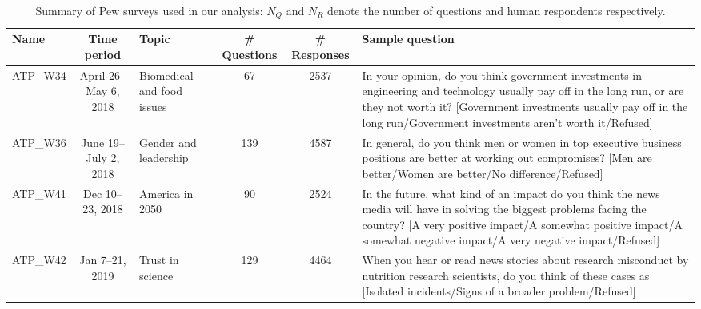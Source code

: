 \begin{table}[t]
    \ContinuedFloat
    \caption{Summary of Pew surveys used in our analysis: $N_Q$ and $N_R$ denote the number of questions and human respondents respectively.}
    \vskip 0.15in
    \renewcommand{\arraystretch}{1.25}
    \begin{center}
    \begin{small}
    
        \begin{tabular}{lcp{1.25cm}ccp{5cm}}
            \toprule
                Name &      Time period &                Topic &  \# Questions &  \# Responses &                                                                                                                                                                                                                                                                          Sample question \\
            \midrule
            ATP\_W34  & April 26–May 6, 2018 &   Biomedical and food issues &           67 &         2537 &                                    In your opinion, do you think government investments in engineering and technology usually pay off in the long run, or are they not worth it? [Government investments usually pay off in the long run/Government investments aren't worth it/Refused] \\
            ATP\_W36  & June 19–July 2, 2018 &      Gender and leadership &          139 &         4587 &                                                                                                                 In general, do you think men or women in top executive business positions are better at working out compromises? [Men are better/Women are better/No difference/Refused] \\
            ATP\_W41  & Dec 10–23, 2018  &           America in 2050 &           90 &         2524 &                                            In the future, what kind of an impact do you think the news media will have in solving the biggest problems facing the country? [A very positive impact/A somewhat positive impact/A somewhat negative impact/A very negative impact/Refused] \\
            ATP\_W42  & Jan 7–21, 2019  &          Trust in science &          129 &         4464 &                                                                                                    When you hear or read news stories about research misconduct by nutrition research scientists, do you think of these cases as [Isolated incidents/Signs of a broader problem/Refused] \\

\end{tabular}
\end{small}
\end{center}
\end{table}
